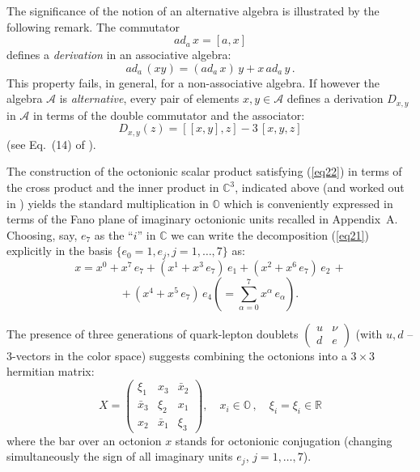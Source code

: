 \documentclass{article}
\newcommand{\be}{\begin{equation}}
\newcommand{\ee}{\end{equation}}
\begin{document}
\smallskip

The significance of the notion of an alternative algebra is illustrated by the following remark. The commutator
$$
ad_a \, x = [a,x]
$$
defines a {\it derivation} in an associative algebra:
$$
ad_a \, (xy) = (ad_a \, x) \, y + x \, ad_a \, y \, .
$$ 
This property fails, in general, for a non-associative algebra. If however the algebra ${\mathcal A}$ is {\it alternative}, every pair of elements $x,y \in {\mathcal A}$ defines a derivation $D_{x,y}$ in ${\mathcal A}$ in terms of the double commutator and the associator:
\be
\label{eq24}
D_{x,y} (z) = \left[[x,y] , z \right] - 3 \, [x,y,z]
\ee
(see Eq.~(14) of \cite{B}).

\smallskip

The construction of the octonionic scalar product satisfying (\ref{eq22}) in terms of the cross product and the inner product in ${\mathbb C}^3$, indicated above (and worked out in \cite{DV, TD}) yields the standard multiplication in ${\mathbb O}$ which is conveniently expressed in terms of the Fano plane of imaginary octonionic units recalled in Appendix~A. Choosing, say, $e_7$ as the ``$i$'' in ${\mathbb C}$ we can write the decomposition (\ref{eq21}) explicitly in the basis $\{e_0 = 1 , e_j , j = 1,\ldots , 7 \}$ as:
$$
x = x^0 + x^7 \, e_7 + (x^1 + x^3 \, e_7) \, e_1 + (x^2 + x^6 \, e_7) \, e_2 \, +
$$
\be
\label{eq25}
+ \, (x^4 + x^5 \, e_7) \, e_4 \left( = \sum_{\alpha = 0}^7 x^{\alpha} \, e_{\alpha} \right) .
\ee

The presence of three generations of quark-lepton doublets $\begin{pmatrix} u &\nu \\ d &e \end{pmatrix}$ (with $u,d$ -- 3-vectors in the color space) suggests combining the octonions into a $3 \times 3$ hermitian matrix:
\be
\label{eq26}
X = \begin{pmatrix}
\xi_1 &x_3 &\bar x_2 \\
\bar x_3 &\xi_2 &x_1 \\
x_2 &\bar x_1 &\xi_3 \end{pmatrix} , \quad x_i \in {\mathbb O} \, , \quad \xi_i = \xi_i \in {\mathbb R}
\ee
where the bar over an octonion $x$ stands for octonionic conjugation (changing simultaneously the sign of all imaginary units $e_j$, $j=1,\ldots ,7$).

\smallskip
\end{document}
